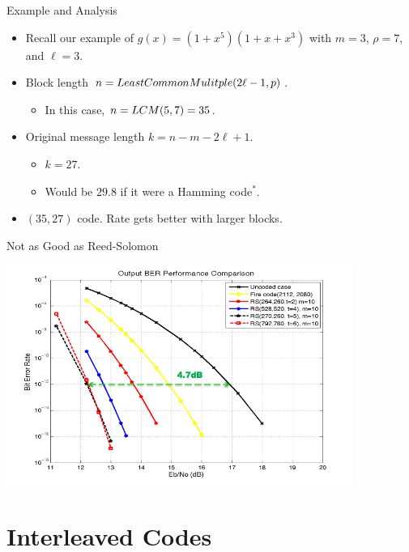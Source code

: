 \documentclass[aspectratio=169]{beamer}
\begin{document}
\begin{frame}{Example and Analysis}
    \begin{itemize}
        \item Recall our example of $g(x) = (1 + x^5)(1 + x + x^3)$ with $m = 3$, $\rho = 7$, and $\ell = 3$.
        \pause
        \item Block length $n = \emph{LeastCommonMulitple}(2\ell - 1, p)$.
        \pause
        \begin{itemize}
            \item In this case, $n = \emph{LCM}(5,7) = 35$.
        \end{itemize}
        \pause
        \item Original message length $k = n - m - 2\ell + 1$.
        \pause
        \begin{itemize}
            \item $k = 27$.
            \pause
            \item Would be $29.8$ if it were a Hamming code$^*$.
        \end{itemize}
        \pause
        \item $(35, 27)$ code. Rate gets better with larger blocks.
    \end{itemize}
\end{frame}

\begin{frame}{Not as Good as Reed-Solomon}
  \begin{center}
    \includegraphics[width=0.85\textwidth]{fire-vs-reed.png}
  \end{center}
\end{frame}

\section{Interleaved Codes}
\frame{\sectionpage}
\end{document}
